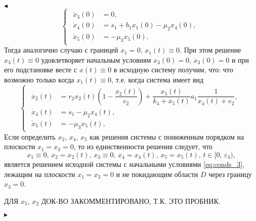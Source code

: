 \documentclass[12pt,a4paper]{extarticle}
\renewenvironment{proof}{\noindent$\blacktriangleleft$}{$\blacktriangleright$}
\theoremstyle{definition}
\theoremstyle{definition}
\theoremstyle{definition}
\begin{document}
\begin{proof}
\begin{equation*}
\begin{cases}
\begin{aligned}
					\dot{x}_3(0) &= 0,\\
					\dot{x}_4(0) &= s_1 + b_1x_1(0)-\mu_2x_4(0),\\
					\dot{x}_5(0) &= -\mu_3x_5(0).
				\end{aligned}
			\end{cases}
		\end{equation*}
		Тогда аналогично случаю с границей $x_1=0$, $x_1(t)\equiv0$. При этом решение $x_3(t)\equiv0$ удовлетворяет начальным условиям $x_3(0)=0,\,\dot{x}_3(0)=0$ и при его подстановке весте с $x(t)\equiv0$ в исходную систему получим, что:
		что возможно только когда $x_1(t)\equiv0$, т.е. когда система имеет вид
		\begin{equation*}
			\begin{cases}
				\begin{aligned}
					\dot{x}_2(t) &= r_2x_2(t)\left(1-\dfrac{x_2(t)}{c_2}\right)+\dfrac{x_5(t)}{k_4+x_5(t)}a_1\dfrac{1}{x_4(t)+e_2},\\
					\dot{x}_4(t) &= s_1-\mu_2x_4(t),\\
					\dot{x}_5(t) &= -\mu_3x_5(t),
				\end{aligned}
			\end{cases}
		\end{equation*}
		Если определить $x_2,\, x_4,\, x_5$ как решения системы с пониженным порядком на плоскости $x_1=x_3=0$, то из единственности решения следует, что
		\[x_1\equiv0,\, x_2=x_2(t),\, x_3\equiv0,\, x_4=x_4(t),\, x_5=x_5(t),\, t\in[0,\,\varepsilon_3),\]
		является решением исходной системы с начальными условиями \ref{eq:conds_3}, лежащим на плоскости $x_1=x_3=0$ и не покидающим области $D$ через границу $x_3=0$.
		
		\MakeUppercase{Для $x_5,\, x_2$ док-во закомментировано, т.к. это пробник.}
		

\end{proof}
\end{document}
